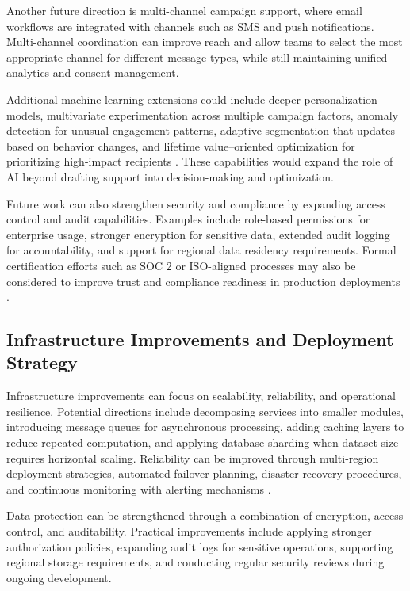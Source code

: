 \documentclass[12pt,journal,compsoc]{IEEEtran}
\begin{document}
Another future direction is multi-channel campaign support, where email workflows are integrated with channels such as SMS and push notifications. Multi-channel coordination can improve reach and allow teams to select the most appropriate channel for different message types, while still maintaining unified analytics and consent management.

Additional machine learning extensions could include deeper personalization models, multivariate experimentation across multiple campaign factors, anomaly detection for unusual engagement patterns, adaptive segmentation that updates based on behavior changes, and lifetime value--oriented optimization for prioritizing high-impact recipients \cite{ref24,ref25}. These capabilities would expand the role of AI beyond drafting support into decision-making and optimization.

Future work can also strengthen security and compliance by expanding access control and audit capabilities. Examples include role-based permissions for enterprise usage, stronger encryption for sensitive data, extended audit logging for accountability, and support for regional data residency requirements. Formal certification efforts such as SOC 2 or ISO-aligned processes may also be considered to improve trust and compliance readiness in production deployments \cite{ref21}.

\subsection{Infrastructure Improvements and Deployment Strategy}
Infrastructure improvements can focus on scalability, reliability, and operational resilience. Potential directions include decomposing services into smaller modules, introducing message queues for asynchronous processing, adding caching layers to reduce repeated computation, and applying database sharding when dataset size requires horizontal scaling. Reliability can be improved through multi-region deployment strategies, automated failover planning, disaster recovery procedures, and continuous monitoring with alerting mechanisms \cite{ref28}.

Data protection can be strengthened through a combination of encryption, access control, and auditability. Practical improvements include applying stronger authorization policies, expanding audit logs for sensitive operations, supporting regional storage requirements, and conducting regular security reviews during ongoing development.
\end{document}
